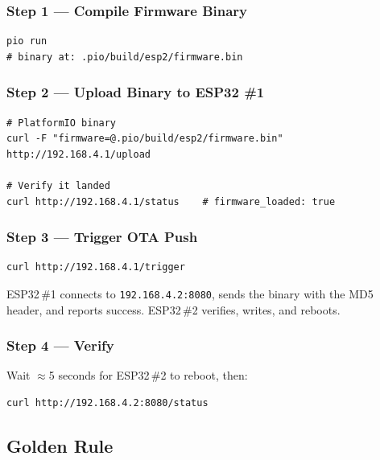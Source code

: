 \documentclass[11pt, a4paper]{article}
\begin{document}
\subsubsection{Step 1 --- Compile Firmware Binary}

\begin{lstlisting}[caption={Compile with PlatformIO}]
pio run
# binary at: .pio/build/esp2/firmware.bin
\end{lstlisting}

\subsubsection{Step 2 --- Upload Binary to ESP32 \#1}

\begin{lstlisting}[caption={Upload binary to ESP32 \#1}]
# PlatformIO binary
curl -F "firmware=@.pio/build/esp2/firmware.bin" http://192.168.4.1/upload

# Verify it landed
curl http://192.168.4.1/status    # firmware_loaded: true
\end{lstlisting}

\subsubsection{Step 3 --- Trigger OTA Push}

\begin{lstlisting}[caption={Trigger OTA push}]
curl http://192.168.4.1/trigger
\end{lstlisting}

ESP32\,\#1 connects to \texttt{192.168.4.2:8080}, sends the binary with the MD5
header, and reports success. ESP32\,\#2 verifies, writes, and reboots.

\subsubsection{Step 4 --- Verify}

Wait $\approx$5 seconds for ESP32\,\#2 to reboot, then:

\begin{lstlisting}[caption={Verify ESP32 \#2 is back online}]
curl http://192.168.4.2:8080/status
\end{lstlisting}


\subsection{Golden Rule}
\end{document}
